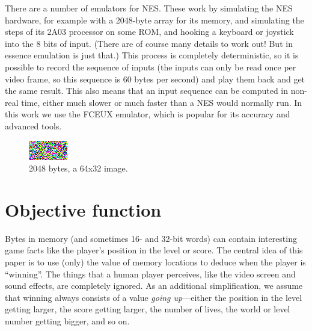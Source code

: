 \documentclass[twocolumn]{article}
\begin{document}

There are a number of emulators for NES. These work by simulating the
NES hardware, for example with a 2048-byte array for its memory, and
simulating the steps of its 2A03 processor on some ROM, and hooking a
keyboard or joystick into the 8 bits of input. (There are of course
many details to work out! But in essence emulation is just that.) This
process is completely deterministic, so it is possible to record the
sequence of inputs (the inputs can only be read once per video frame,
so this sequence is 60 bytes per second) and play them back and get
the same result. This also means that an input sequence can be
computed in non-real time, either much slower or much faster than a
NES would normally run. In this work we use the FCEUX\cite{FCEUX}
emulator, which is popular for its accuracy and advanced tools.

\begin{figure}[ht]
\begin{center}
\includegraphics[width=0.75 \linewidth]{bytes2048}
\end{center}\vspace{-0.1in}
\caption{2048 bytes, a 64x32 image.}
\label{fig:bytes2048}
\end{figure}

\section{Objective function}

Bytes in memory (and sometimes 16- and 32-bit words) can contain
interesting game facts like the player's position in the level or
score. The central idea of this paper is to use (only) the value of
memory locations to deduce when the player is ``winning''. The things
that a human player perceives, like the video screen and sound
effects, are completely ignored. As an additional simplification, we
assume that winning always consists of a value {\it going up}---either
the position in the level getting larger, the score getting larger,
the number of lives, the world or level number getting bigger, and so
on.
\end{document}
